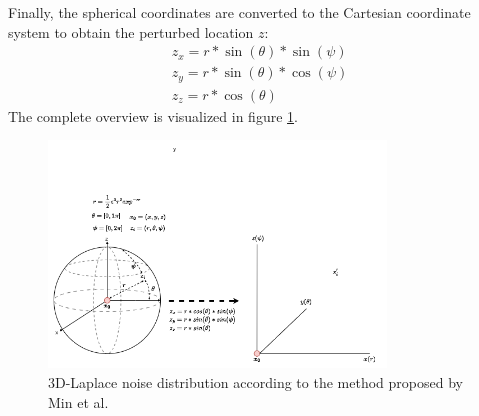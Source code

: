 Finally, the spherical coordinates are converted to the Cartesian coordinate system to obtain the perturbed location $z$:
\begin{align*}
  z_x = r * \sin(\theta) * \sin(\psi) \\
  z_y = r * \sin(\theta) * \cos(\psi) \\
  z_z = r * \cos(\theta)
\end{align*}
The complete overview is visualized in figure \ref{fig:3d-laplace}.
\begin{figure}
  \includegraphics[width=0.8\textwidth]{TheorethicalFramework/ND-Laplace/Images/3d_laplace.png}
  \caption{3D-Laplace noise distribution according to the method proposed by Min et al. \citep{9646489}}
  \label{fig:3d-laplace}
\end{figure}
\newpage
